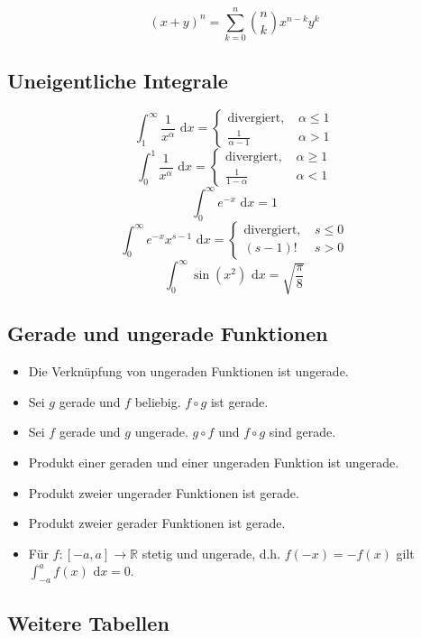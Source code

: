 \documentclass[a4paper,10pt]{article}
\def\dx{\text{ d}x}
\begin{document}
$$(x+y)^n = \sum_{k=0}^n {n \choose k} x^{n-k} y^k$$

\subsection{Uneigentliche Integrale}
$$\int_1^\infty \frac{1}{x^\alpha} \dx = \begin{cases}
  \text{divergiert, } & \alpha \leq 1\\
  \frac{1}{\alpha - 1} & \alpha > 1
\end{cases}$$
$$\int_0^1 \frac{1}{x^\alpha} \dx = \begin{cases}
  \text{divergiert, } & \alpha \geq 1\\
  \frac{1}{1- \alpha} & \alpha < 1
\end{cases}$$
$$\int_0^\infty e^{-x} \dx = 1$$
$$\int_0^\infty e^{-x}x^{s-1} \dx = \begin{cases}
  \text{divergiert, } & s \leq 0\\
  (s-1)! & s > 0
\end{cases}$$
$$\int_0^\infty \sin(x^2) \dx = \sqrt{\frac{\pi}{8}}$$

\subsection{Gerade und ungerade Funktionen}
\begin{itemize}
  \item Die Verknüpfung von ungeraden Funktionen ist ungerade. 
  \item Sei $g$ gerade und $f$ beliebig. $f \circ g$ ist gerade.
  \item Sei $f$ gerade und $g$ ungerade. $g \circ f$ und $f \circ g$ sind gerade.
  \item Produkt einer geraden und einer ungeraden Funktion ist ungerade.
  \item Produkt zweier ungerader Funktionen ist gerade.
  \item Produkt zweier gerader Funktionen ist gerade.
  \item Für $f: [-a, a] \to \mathbb{R}$ stetig und ungerade, d.h. $f(-x) = -f(x)$ gilt $\int_{-a}^a f(x) \dx = 0$.
\end{itemize}


\subsection{Weitere Tabellen}
\end{document}
